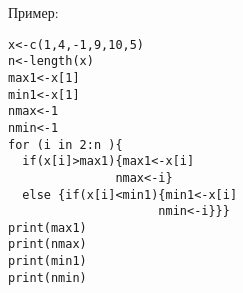 \documentclass[12pt, a4paper]{article}
\begin{document}
 
Пример:
\begin{verbatim}
x<-c(1,4,-1,9,10,5)
n<-length(x)
max1<-x[1]
min1<-x[1]
nmax<-1
nmin<-1
for (i in 2:n ){
  if(x[i]>max1){max1<-x[i]
               nmax<-i}  
  else {if(x[i]<min1){min1<-x[i]
                     nmin<-i}}}
print(max1)
print(nmax)
print(min1)
print(nmin)
\end{verbatim}
\end{document}
